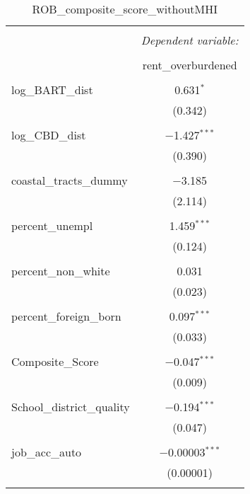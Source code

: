 \documentclass[10pt, letterpaper]{amsart}
\begin{document}
\begin{table}[!htbp] \centering 
  \caption{ROB\_composite\_score\_withoutMHI} 
  \label{} 
  \begin{tabular}{@{\extracolsep{5pt}}lc} 
    \\[-1.8ex]\hline 
    \hline \\[-1.8ex] 
    & \multicolumn{1}{c}{\textit{Dependent variable:}} \\ 
    \cline{2-2} 
    \\[-1.8ex] & rent\_overburdened \\ 
    \hline \\[-1.8ex] 
    log\_BART\_dist & 0.631$^{*}$ \\ 
    & (0.342) \\ 
    & \\ 
    log\_CBD\_dist & $-$1.427$^{***}$ \\ 
    & (0.390) \\ 
    & \\ 
    coastal\_tracts\_dummy & $-$3.185 \\ 
    & (2.114) \\ 
    & \\ 
    percent\_unempl & 1.459$^{***}$ \\ 
    & (0.124) \\ 
    & \\ 
    percent\_non\_white & 0.031 \\ 
    & (0.023) \\ 
    & \\ 
    percent\_foreign\_born & 0.097$^{***}$ \\ 
    & (0.033) \\ 
    & \\ 
    Composite\_Score & $-$0.047$^{***}$ \\ 
    & (0.009) \\ 
    & \\ 
    School\_district\_quality & $-$0.194$^{***}$ \\ 
    & (0.047) \\ 
    & \\ 
    job\_acc\_auto & $-$0.00003$^{***}$ \\ 
    & (0.00001) \\ 
    & \\ 

\end{tabular}
\end{table}
\end{document}
